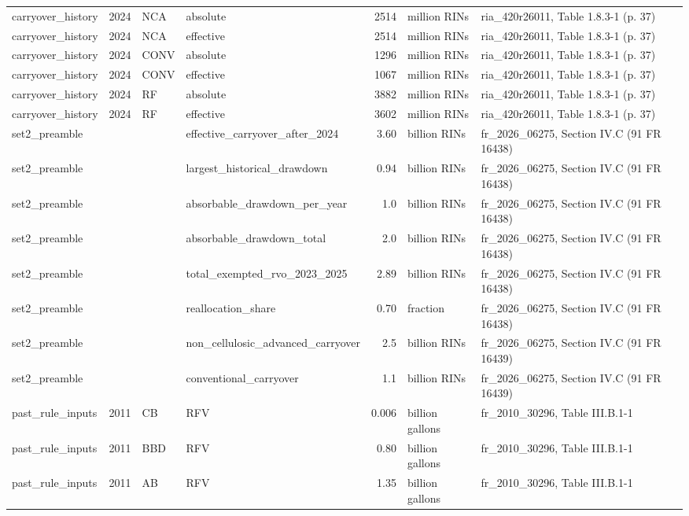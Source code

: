 \begin{longtable}{p{2.3cm}p{0.7cm}p{1.0cm}p{2.6cm}rp{1.7cm}p{4.6cm}}
carryover\_history & 2024 & NCA & absolute & 2514 & million RINs & ria\_420r26011, Table 1.8.3-1 (p. 37) \\
carryover\_history & 2024 & NCA & effective & 2514 & million RINs & ria\_420r26011, Table 1.8.3-1 (p. 37) \\
carryover\_history & 2024 & CONV & absolute & 1296 & million RINs & ria\_420r26011, Table 1.8.3-1 (p. 37) \\
carryover\_history & 2024 & CONV & effective & 1067 & million RINs & ria\_420r26011, Table 1.8.3-1 (p. 37) \\
carryover\_history & 2024 & RF & absolute & 3882 & million RINs & ria\_420r26011, Table 1.8.3-1 (p. 37) \\
carryover\_history & 2024 & RF & effective & 3602 & million RINs & ria\_420r26011, Table 1.8.3-1 (p. 37) \\
set2\_preamble &  &  & effective\_carryover\_after\_2024 & 3.60 & billion RINs & fr\_2026\_06275, Section IV.C (91 FR 16438) \\
set2\_preamble &  &  & largest\_historical\_drawdown & 0.94 & billion RINs & fr\_2026\_06275, Section IV.C (91 FR 16438) \\
set2\_preamble &  &  & absorbable\_drawdown\_per\_year & 1.0 & billion RINs & fr\_2026\_06275, Section IV.C (91 FR 16438) \\
set2\_preamble &  &  & absorbable\_drawdown\_total & 2.0 & billion RINs & fr\_2026\_06275, Section IV.C (91 FR 16438) \\
set2\_preamble &  &  & total\_exempted\_rvo\_2023\_2025 & 2.89 & billion RINs & fr\_2026\_06275, Section IV.C (91 FR 16438) \\
set2\_preamble &  &  & reallocation\_share & 0.70 & fraction & fr\_2026\_06275, Section IV.C (91 FR 16438) \\
set2\_preamble &  &  & non\_cellulosic\_advanced\_carryover & 2.5 & billion RINs & fr\_2026\_06275, Section IV.C (91 FR 16439) \\
set2\_preamble &  &  & conventional\_carryover & 1.1 & billion RINs & fr\_2026\_06275, Section IV.C (91 FR 16439) \\
past\_rule\_inputs & 2011 & CB & RFV & 0.006 & billion gallons & fr\_2010\_30296, Table III.B.1-1 \\
past\_rule\_inputs & 2011 & BBD & RFV & 0.80 & billion gallons & fr\_2010\_30296, Table III.B.1-1 \\
past\_rule\_inputs & 2011 & AB & RFV & 1.35 & billion gallons & fr\_2010\_30296, Table III.B.1-1 \\

\end{longtable}

